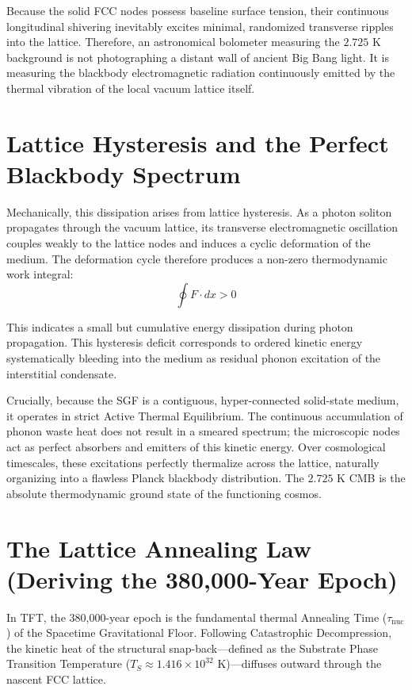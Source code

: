 Because the solid FCC nodes possess baseline surface tension, their continuous longitudinal shivering inevitably excites minimal, randomized transverse ripples into the lattice. Therefore, an astronomical bolometer measuring the $2.725 \text{ K}$ background is not photographing a distant wall of ancient Big Bang light. It is measuring the blackbody electromagnetic radiation continuously emitted by the thermal vibration of the local vacuum lattice itself.

\section{Lattice Hysteresis and the Perfect Blackbody Spectrum}
\label{sec:lattice_hysteresis_blackbody}

Mechanically, this dissipation arises from lattice hysteresis. As a photon soliton propagates through the vacuum lattice, its transverse electromagnetic oscillation couples weakly to the lattice nodes and induces a cyclic deformation of the medium. The deformation cycle therefore produces a non-zero thermodynamic work integral:
\[
\oint F \cdot dx > 0
\]

This indicates a small but cumulative energy dissipation during photon propagation. This hysteresis deficit corresponds to ordered kinetic energy systematically bleeding into the medium as residual phonon excitation of the interstitial condensate.

Crucially, because the SGF is a contiguous, hyper-connected solid-state medium, it operates in strict Active Thermal Equilibrium. The continuous accumulation of phonon waste heat does not result in a smeared spectrum; the microscopic nodes act as perfect absorbers and emitters of this kinetic energy. Over cosmological timescales, these excitations perfectly thermalize across the lattice, naturally organizing into a flawless Planck blackbody distribution. The $2.725 \text{ K}$ CMB is the absolute thermodynamic ground state of the functioning cosmos.

\section{The Lattice Annealing Law (Deriving the 380,000-Year Epoch)}
In TFT, the 380,000-year epoch is the fundamental thermal Annealing Time ($\tau_{\text{nuc}}$) of the Spacetime Gravitational Floor. Following Catastrophic Decompression, the kinetic heat of the structural snap-back---defined as the Substrate Phase Transition Temperature ($T_S \approx 1.416 \times 10^{32} \text{ K}$)---diffuses outward through the nascent FCC lattice. 

